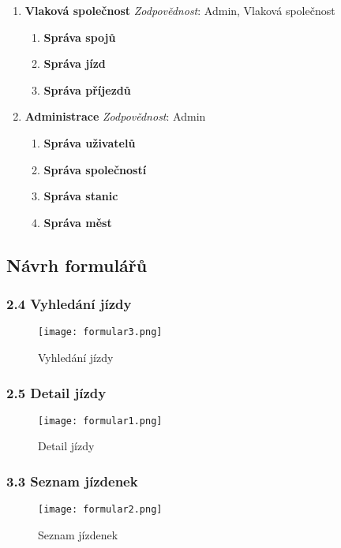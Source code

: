 \documentclass[11pt]{article}
\begin{document}
\begin{enumerate}
    \item \textbf{Vlaková společnost}
        \textit{Zodpovědnost}: Admin, Vlaková společnost
        \begin{enumerate}
            \item \textbf{Správa spojů}
            \item \textbf{Správa jízd}
            \item \textbf{Správa příjezdů}
        \end{enumerate}
    
    \item \textbf{Administrace}
        \textit{Zodpovědnost}: Admin
        \begin{enumerate}
            \item \textbf{Správa uživatelů}
            \item \textbf{Správa společností}
            \item \textbf{Správa stanic}
            \item \textbf{Správa měst}
        \end{enumerate}
\end{enumerate}


\subsection{Návrh formulářů}

\subsubsection*{2.4 Vyhledání jízdy}

\begin{figure}[H]
    \texttt{[image: formular3.png]}
    \centering
    \caption{Vyhledání jízdy}
    \label{vystup}
\end{figure}

\subsubsection*{2.5 Detail jízdy}

\begin{figure}[H]
    \texttt{[image: formular1.png]}
    \centering
    \caption{Detail jízdy}
    \label{vystup}
\end{figure}

\subsubsection*{3.3 Seznam jízdenek}

\begin{figure}[H]
    \texttt{[image: formular2.png]}
    \centering
    \caption{Seznam jízdenek}
    \label{vystup}
\end{figure}

\end{document}
